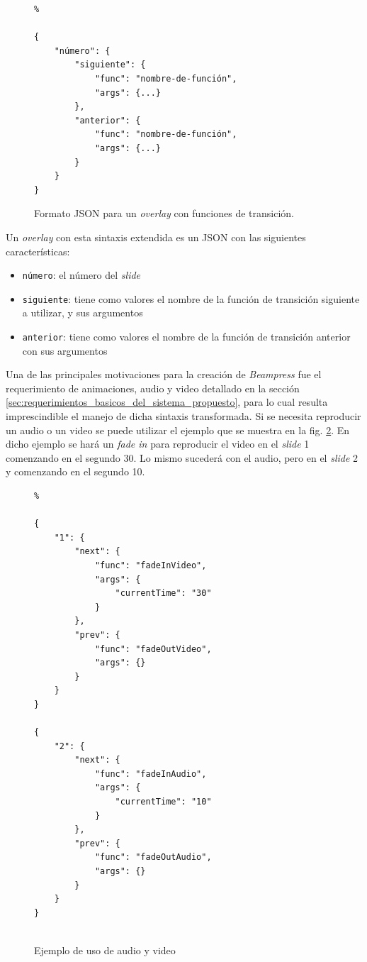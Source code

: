 		\begin{figure}[htb]%
			\begin{lstlisting}%

{
    "número": {
        "siguiente": {
            "func": "nombre-de-función",
            "args": {...}
        },
        "anterior": {
            "func": "nombre-de-función",
            "args": {...}
        }
    }
}	
			\end{lstlisting}
		\caption{
			Formato JSON para un \textit{overlay} con funciones de transición. 
			\label{fig:json_format} }
		\end{figure}


	Un \textit{overlay} con esta sintaxis extendida es un JSON con las siguientes características:
	\begin{itemize}
		\item \texttt{número}: el número del \textit{slide}
		\item \texttt{siguiente}: tiene como valores el nombre de la función de transición siguiente a utilizar, y sus argumentos
		\item \texttt{anterior}: tiene como valores el nombre de la función de transición anterior con sus argumentos
	\end{itemize}

	Una de las principales motivaciones para la creación de \textit{Beampress} fue el requerimiento de animaciones, audio y video detallado en la sección \ref{sec:requerimientos_basicos_del_sistema_propuesto}, para lo cual resulta imprescindible el manejo de dicha sintaxis transformada. Si se necesita reproducir un audio o un video se puede utilizar el ejemplo que se muestra en la fig. \ref{fig:ex_audio_video_syntax}. En dicho ejemplo se hará un \textit{fade in} para reproducir el video en el \textit{slide} 1 comenzando en el segundo 30. Lo mismo sucederá con el audio, pero en el \textit{slide} 2 y comenzando en el segundo 10.


	\begin{figure}[htb]%
		\begin{lstlisting}%

{
    "1": {
        "next": {
            "func": "fadeInVideo",
            "args": {
                "currentTime": "30"
            }
        },
        "prev": {
            "func": "fadeOutVideo",
            "args": {}
        }
    }
}

{
    "2": {
        "next": {
            "func": "fadeInAudio",
            "args": {
                "currentTime": "10"
            }
        },
        "prev": {
            "func": "fadeOutAudio",
            "args": {}
        }
    }
}
				
		\end{lstlisting}
		\caption{Ejemplo de uso de audio y video} 
			\label{fig:ex_audio_video_syntax}
		\end{figure}

